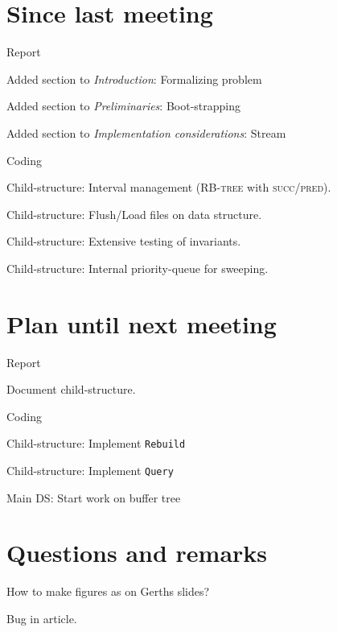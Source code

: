 \documentclass[a4paper,11pt,agenda]{meetingmins}
\begin{document}
\maketitle

\section{Since last meeting}
\begin{items}
\item Report
	\begin{items}
		\item Added section to \textit{Introduction}: Formalizing problem
		\item Added section to \textit{Preliminaries}: Boot-strapping
		\item Added section to \textit{Implementation considerations}: Stream
	\end{items}
\item Coding
	\begin{items}
		\item Child-structure: Interval management (\textsc{RB-tree} with \textsc{succ}/\textsc{pred}).
		\item Child-structure: Flush/Load files on data structure.
		\item Child-structure: Extensive testing of invariants.
		\item Child-structure: Internal priority-queue for sweeping.
	\end{items}
\end{items}

\section{Plan until next meeting}
\begin{items}
\item Report
	\begin{items}
		\item Document child-structure.
	\end{items}
\item Coding
	\begin{items}
		\item Child-structure: Implement \texttt{Rebuild}
		\item Child-structure: Implement \texttt{Query}
		\item Main DS: Start work on buffer tree
	\end{items}
\end{items}

\section{Questions and remarks}
\begin{items}
	\item How to make figures as on Gerths slides?
	\item Bug in article.
\end{items}
\end{document}
